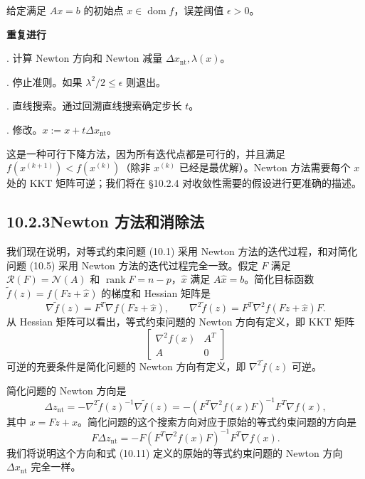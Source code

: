 \documentclass[UTF8,12pt,a4paper,fontset=fandol]{ctexart}
\begin{document}
给定满足 $Ax=b$ 的初始点 $x\in\operatorname{dom} f$，误差阈值 $\epsilon>0$。

\noindent\textbf{重复进行}

. 计算 Newton 方向和 Newton 减量 $\Delta x_{\mathrm{nt}},\lambda(x)$。

. 停止准则。如果 $\lambda^2/2\leq \epsilon$ 则退出。

. 直线搜索。通过回溯直线搜索确定步长 $t$。

. 修改。$x:=x+t\Delta x_{\mathrm{nt}}$。

这是一种可行下降方法，因为所有迭代点都是可行的，并且满足 $f(x^{(k+1)})<f(x^{(k)})$（除非 $x^{(k)}$ 已经是最优解）。Newton 方法需要每个 $x$ 处的 KKT 矩阵可逆；我们将在 \S10.2.4 对收敛性需要的假设进行更准确的描述。

\subsection*{10.2.3\quad Newton 方法和消除法}

我们现在说明，对等式约束问题 (10.1) 采用 Newton 方法的迭代过程，和对简化问题 (10.5) 采用 Newton 方法的迭代过程完全一致。假定 $F$ 满足 $\mathcal{R}(F)=\mathcal{N}(A)$ 和 $\operatorname{rank}F=n-p$，$\hat{x}$ 满足 $A\hat{x}=b$。简化目标函数 $\tilde{f}(z)=f(Fz+\hat{x})$ 的梯度和 Hessian 矩阵是
\[
\nabla\tilde{f}(z)=F^T\nabla f(Fz+\hat{x}),\qquad
\nabla^2\tilde{f}(z)=F^T\nabla^2 f(Fz+\hat{x})F.
\]
从 Hessian 矩阵可以看出，等式约束问题的 Newton 方向有定义，即 KKT 矩阵
\[
\begin{bmatrix}
\nabla^2 f(x) & A^T\\
A & 0
\end{bmatrix}
\]
可逆的充要条件是简化问题的 Newton 方向有定义，即 $\nabla^2\tilde{f}(z)$ 可逆。

简化问题的 Newton 方向是
\begin{equation}
\Delta z_{\mathrm{nt}}
=-\nabla^2\tilde{f}(z)^{-1}\nabla\tilde{f}(z)
=-(F^T\nabla^2 f(x)F)^{-1}F^T\nabla f(x),
\tag{10.15}
\end{equation}
其中 $x=Fz+\hat{x}$。简化问题的这个搜索方向对应于原始的等式约束问题的方向是
\[
F\Delta z_{\mathrm{nt}}=-F(F^T\nabla^2 f(x)F)^{-1}F^T\nabla f(x).
\]
我们将说明这个方向和式 (10.11) 定义的原始的等式约束问题的 Newton 方向 $\Delta x_{\mathrm{nt}}$ 完全一样。
\end{document}
